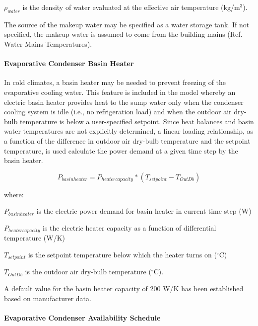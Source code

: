 \({\rho_{water}}\) is the density of water evaluated at the effective air temperature (kg/m\(^{3}\)).

The source of the makeup water may be specified as a water storage tank. If not specified, the makeup water is assumed to come from the building mains (Ref. Water Mains Temperatures).

\paragraph{Evaporative Condenser Basin Heater}\label{evaporative-condenser-basin-heater}

In cold climates, a basin heater may be needed to prevent freezing of the evaporative cooling water. This feature is included in the model whereby an electric basin heater provides heat to the sump water only when the condenser cooling system is idle (i.e., no refrigeration load) and when the outdoor air dry-bulb temperature is below a user-specified setpoint. Since heat balances and basin water temperatures are not explicitly determined, a linear loading relationship, as a function of the difference in outdoor air dry-bulb temperature and the setpoint temperature, is used calculate the power demand at a given time step by the basin heater.

\begin{equation}
{P_{basinheater}} = {P_{heatercapacity}}*({T_{setpoint}} - {T_{OutDb}})
\end{equation}

where:

\({P_{basinheater}}\) is the electric power demand for basin heater in current time step (W)

\({P_{heatercapacity}}\) is the electric heater capacity as a function of differential temperature (W/K)

\({T_{setpoint}}\) is the setpoint temperature below which the heater turns on (\(^{\circ}\)C)

\({T_{OutDb}}\) is the outdoor air dry-bulb temperature (\(^{\circ}\)C).

A default value for the basin heater capacity of 200 W/K has been established based on manufacturer data.

\paragraph{Evaporative Condenser Availability Schedule}\label{evaporative-condenser-availability-schedule}

